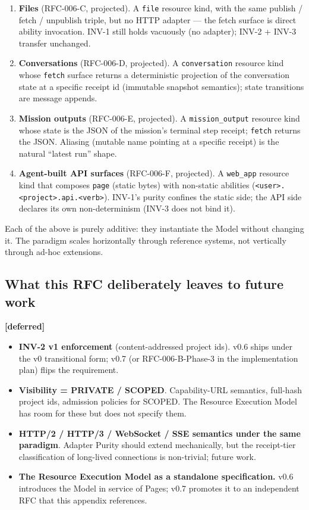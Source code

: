 \documentclass[11pt,a4paper]{article}
\newcommand{\deferred}{\textcolor{deferredcolor}{\textbf{[deferred]}}\xspace}
\theoremstyle{definition}
\begin{document}
\begin{enumerate}[leftmargin=2em,itemsep=0.15em]
    \item \textbf{Files} (RFC-006-C, projected). A
    \texttt{file} resource kind, with the same publish /
    fetch / unpublish triple, but no HTTP adapter --- the
    fetch surface is direct ability invocation. INV-1 still
    holds vacuously (no adapter); INV-2 + INV-3 transfer
    unchanged.
    \item \textbf{Conversations} (RFC-006-D, projected). A
    \texttt{conversation} resource kind whose \texttt{fetch}
    surface returns a deterministic projection of the
    conversation state at a specific receipt id (immutable
    snapshot semantics); state transitions are
    message appends.
    \item \textbf{Mission outputs} (RFC-006-E, projected). A
    \texttt{mission\_output} resource kind whose state is the
    JSON of the mission's terminal step receipt; \texttt{fetch}
    returns the JSON. Aliasing (mutable name pointing at a
    specific receipt) is the natural ``latest run'' shape.
    \item \textbf{Agent-built API surfaces} (RFC-006-F,
    projected). A \texttt{web\_app} resource kind that
    composes \texttt{page} (static bytes) with non-static
    abilities (\texttt{<user>.<project>.api.<verb>}). INV-1's
    purity confines the static side; the API side declares
    its own non-determinism (INV-3 does not bind it).
\end{enumerate}

Each of the above is purely additive: they instantiate the
Model without changing it. The paradigm scales horizontally
through reference systems, not vertically through ad-hoc
extensions.

\subsection{What this RFC deliberately leaves to future work}

\deferred{}

\begin{itemize}[leftmargin=2em,itemsep=0.15em]
    \item \textbf{INV-2 v1 enforcement} (content-addressed
    project ids). v0.6 ships under the v0 transitional form;
    v0.7 (or RFC-006-B-Phase-3 in the implementation plan)
    flips the requirement.
    \item \textbf{Visibility = PRIVATE / SCOPED}.
    Capability-URL semantics, full-hash project ids,
    admission policies for SCOPED. The Resource Execution
    Model has room for these but does not specify them.
    \item \textbf{HTTP/2 / HTTP/3 / WebSocket / SSE
    semantics under the same paradigm}. Adapter Purity should
    extend mechanically, but the receipt-tier classification
    of long-lived connections is non-trivial; future work.
    \item \textbf{The Resource Execution Model as a
    standalone specification.} v0.6 introduces the Model in
    service of Pages; v0.7 promotes it to an independent RFC
    that this appendix references.
\end{itemize}
\end{document}
